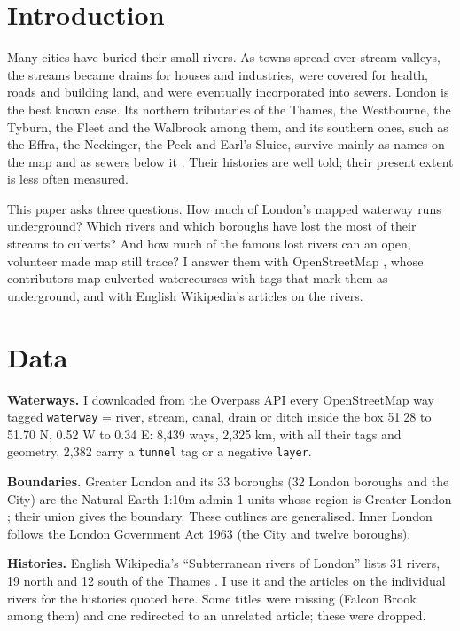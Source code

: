 \documentclass[11pt,a4paper]{article}
\begin{document}
\section{Introduction}
Many cities have buried their small rivers. As towns spread over stream valleys, the streams became drains for houses and industries, were covered for health, roads and building land, and were eventually incorporated into sewers. London is the best known case. Its northern tributaries of the Thames, the Westbourne, the Tyburn, the Fleet and the Walbrook among them, and its southern ones, such as the Effra, the Neckinger, the Peck and Earl's Sluice, survive mainly as names on the map and as sewers below it \citep{wikisub}. Their histories are well told; their present extent is less often measured.

This paper asks three questions. How much of London's mapped waterway runs underground? Which rivers and which boroughs have lost the most of their streams to culverts? And how much of the famous lost rivers can an open, volunteer made map still trace? I answer them with OpenStreetMap \citep{osm}, whose contributors map culverted watercourses with tags that mark them as underground, and with English Wikipedia's articles on the rivers.

\section{Data}
\textbf{Waterways.} I downloaded from the Overpass API every OpenStreetMap way tagged \texttt{waterway} = river, stream, canal, drain or ditch inside the box 51.28 to 51.70 N, 0.52 W to 0.34 E: 8,439 ways, 2,325 km, with all their tags and geometry. 2,382 carry a \texttt{tunnel} tag or a negative \texttt{layer}.

\textbf{Boundaries.} Greater London and its 33 boroughs (32 London boroughs and the City) are the Natural Earth 1:10m admin-1 units whose region is Greater London \citep{naturalearth}; their union gives the boundary. These outlines are generalised. Inner London follows the London Government Act 1963 (the City and twelve boroughs).

\textbf{Histories.} English Wikipedia's ``Subterranean rivers of London'' lists 31 rivers, 19 north and 12 south of the Thames \citep{wikisub}. I use it and the articles on the individual rivers \citep{wikirivers} for the histories quoted here. Some titles were missing (Falcon Brook among them) and one redirected to an unrelated article; these were dropped.
\end{document}
